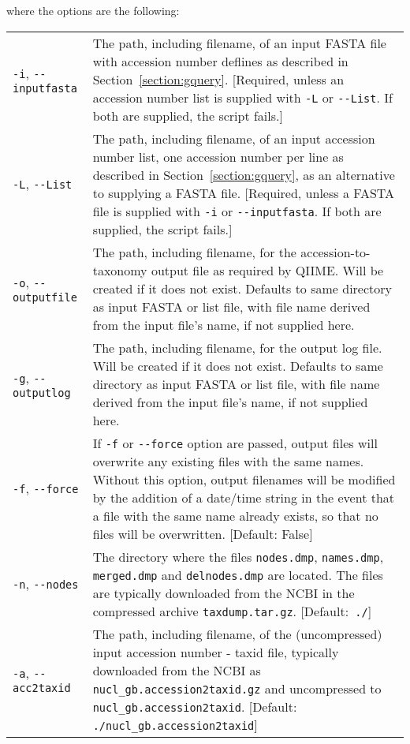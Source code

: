 \documentclass[11pt]{amsart}
\begin{document}
where the options are the following:

\begin{longtable}{@{} p{1.4in} p{5.35in} @{}}
      \verb|-i|, \verb|--inputfasta| & The path, including filename, of an input FASTA file with accession number deflines as described in Section~\ref{section:gquery}. [Required, unless an accession number list is supplied with \verb|-L| or \verb|--List|. If both are supplied, the script fails.] \\
      \verb|-L|, \verb|--List| & The path, including filename, of an input accession number list, one accession number per line as described in Section~\ref{section:gquery}, as an alternative to supplying a FASTA file. [Required, unless a FASTA file is supplied with \verb|-i| or \verb|--inputfasta|. If both are supplied, the script fails.] \\
      \verb|-o|, \verb|--outputfile| & The path, including filename, for the accession-to-taxonomy output file as required by QIIME. Will be created if it does not exist. Defaults to same directory as input FASTA or list file, with file name derived from the input file's name, if not supplied here. \\
      \verb|-g|, \verb|--outputlog| & The path, including filename, for the output log file. Will be created if it does not exist. Defaults to same directory as input FASTA or list file, with file name derived from the input file's name, if not supplied here. \\
      \verb|-f|, \verb|--force| & If \verb|-f| or \verb|--force| option are passed, output files will overwrite any existing files with the same names. Without this option, output filenames will be modified by the addition of a date/time string in the event that a file with the same name already exists, so that no files will be overwritten. [Default: False] \\
      \verb|-n|, \verb|--nodes| & The directory where the files \verb|nodes.dmp|, \verb|names.dmp|, \verb|merged.dmp| and \verb|delnodes.dmp| are located. The files are typically downloaded from the NCBI in the compressed archive \verb|taxdump.tar.gz|. [Default:\verb| ./|] \\
      \verb|-a|, \verb|--acc2taxid| & The path, including filename, of the (uncompressed) input accession number - taxid file, typically downloaded from the NCBI as \verb|nucl_gb.accession2taxid.gz| and uncompressed to \verb|nucl_gb.accession2taxid|. [Default:\verb| ./nucl_gb.accession2taxid|] \\

\end{longtable}
\end{document}
